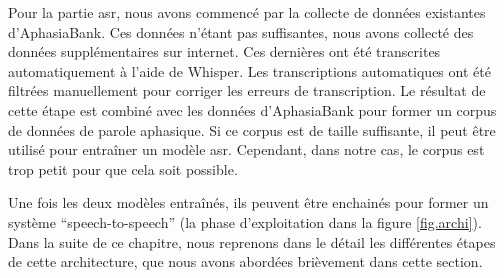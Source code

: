 Pour la partie \gls{asr}, nous avons commencé par la collecte de données existantes d'AphasiaBank.
Ces données n'étant pas suffisantes, nous avons collecté des données supplémentaires sur internet.
Ces dernières ont été transcrites automatiquement à l'aide de \foreignlanguage{english}{Whisper}.
Les transcriptions automatiques ont été filtrées manuellement pour corriger les erreurs de transcription.
Le résultat de cette étape est combiné avec les données d'AphasiaBank 
pour former un corpus de données de parole aphasique.
Si ce corpus est de taille suffisante, il peut être utilisé pour entraîner un modèle \gls{asr}.
Cependant, dans notre cas, le corpus est trop petit pour que cela soit possible.

Une fois les deux modèles entraînés,
ils peuvent être enchainés pour former un système ``\foreignlanguage{english}{speech-to-speech}''
(la phase d'exploitation dans la figure \ref{fig.archi}).
Dans la suite de ce chapitre, 
nous reprenons dans le détail les différentes étapes de cette architecture, 
que nous avons abordées brièvement dans cette section.
